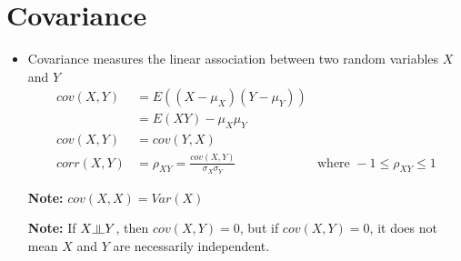 \documentclass[10pt, twoside, a4paper]{book}
\newcommand{\indep}{\rotatebox[origin=c]{90}{$\models$}}
\theoremstyle{definition}
\begin{document}
\section{Covariance}
\begin{itemize}
  \item Covariance measures the linear association between two random variables
  $X$ and $Y$
  \begin{equation*}
	\renewcommand{\arraystretch}{1.6}
	\begin{array}{lll}
	cov(X,Y) & = E((X-\mu_X)(Y-\mu_Y)) \\
	& = E(XY) - \mu_X\mu_Y \\
	cov(X,Y) & = cov(Y,X) \\
	corr(X,Y) & = \rho_{XY} = \frac{cov(X,Y)}{\sigma_X \sigma_Y} & \text{where } -1
	\leq \rho_{XY} \leq 1
	\end{array}
	\end{equation*}
	\item[\bf{Note:}] $cov(X,X) = Var(X)$
	\item[\bf{Note:}] If $X \indep Y$, then $cov(X,Y) = 0$, but if $cov(X,Y) = 0$,
	it does not mean $X$ and $Y$ are necessarily independent.
\end{itemize}
\end{document}
